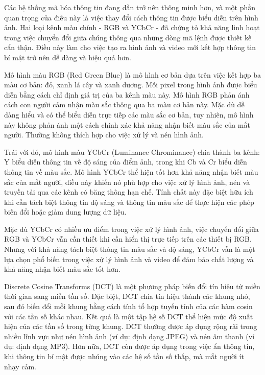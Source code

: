 Các hệ thống mã hóa thông tin đang dần trở nên thông minh hơn, và một phần quan trọng của điều này là việc thay đổi cách thông tin được biểu diễn trên hình ảnh. Hai loại kênh màu chính - RGB và YCbCr - đã chứng tỏ khả năng linh hoạt trong việc chuyển đổi giữa chúng thông qua những dòng mã lệnh được thiết kế cẩn thận. Điều này làm cho việc tạo ra hình ảnh và video mới kết hợp thông tin bí mật trở nên dễ dàng và hiệu quả hơn.

Mô hình màu RGB (Red Green Blue) là mô hình cơ bản dựa trên việc kết hợp ba màu cơ bản: đỏ, xanh lá cây và xanh dương. Mỗi pixel trong hình ảnh được biểu diễn bằng cách chỉ định giá trị của ba kênh màu này. Mô hình RGB phản ánh cách con người cảm nhận màu sắc thông qua ba màu cơ bản này. Mặc dù dễ dàng hiểu và có thể biểu diễn trực tiếp các màu sắc cơ bản, tuy nhiên, mô hình này không phản ánh một cách chính xác khả năng nhận biết màu sắc của mắt người. Thường không thích hợp cho việc xử lý và nén hình ảnh.

Trái với đó, mô hình màu YCbCr (Luminance Chrominance) chia thành ba kênh: Y biểu diễn thông tin về độ sáng của điểm ảnh, trong khi Cb và Cr biểu diễn thông tin về màu sắc. Mô hình YCbCr thể hiện tốt hơn khả năng nhận biết màu sắc của mắt người, điều này khiến nó phù hợp cho việc xử lý hình ảnh, nén và truyền tải qua các kênh có băng thông hạn chế. Tính chất này đặc biệt hữu ích khi cần tách biệt thông tin độ sáng và thông tin màu sắc để thực hiện các phép biến đổi hoặc giảm dung lượng dữ liệu.

Mặc dù YCbCr có nhiều ưu điểm trong việc xử lý hình ảnh, việc chuyển đổi giữa RGB và YCbCr vẫn cần thiết khi cần hiển thị trực tiếp trên các thiết bị RGB. Nhưng với khả năng tách biệt thông tin màu sắc và độ sáng, YCbCr vẫn là một lựa chọn phổ biến trong việc xử lý hình ảnh và video để đảm bảo chất lượng và khả năng nhận biết màu sắc tốt hơn.

Discrete Cosine Transforms (DCT) là một phương pháp biến đổi tín hiệu từ miền thời gian sang miền tần số. Đặc biệt, DCT chia tín hiệu thành các khung nhỏ, sau đó biến đổi mỗi khung bằng cách tính tổ hợp tuyến tính của các hàm cosin với các tần số khác nhau. Kết quả là một tập hệ số DCT thể hiện mức độ xuất hiện của các tần số trong từng khung. DCT thường được áp dụng rộng rãi trong nhiều lĩnh vực như nén hình ảnh (ví dụ: định dạng JPEG) và nén âm thanh (ví dụ: định dạng MP3). Hơn nữa, DCT còn được áp dụng trong việc ẩn thông tin, khi thông tin bí mật được nhúng vào các hệ số tần số thấp, mà mắt người ít nhạy cảm.

